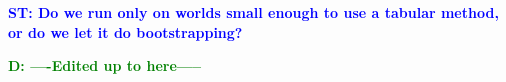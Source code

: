 \documentclass[conference]{IEEEtran}
\newcommand{\stnote}[1]{\textcolor{Blue}{\textbf{ST: #1}}}
\newcommand{\dnote}[1]{\textcolor{Green}{\textbf{D: #1}}}
\newcommand{\argmax}{\operatornamewithlimits{argmax}}
\begin{document}





\stnote{Do we run only on worlds small enough to use a tabular method, or do we let it do bootstrapping?}

\dnote{----Edited up to here-----}
\end{document}
